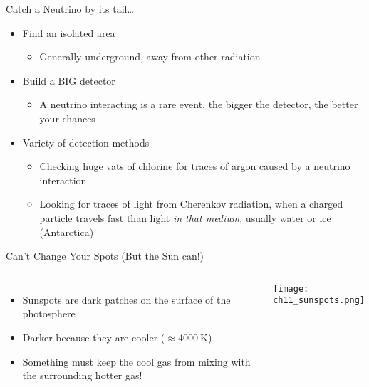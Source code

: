\documentclass[pdf, aspectratio=169]{beamer}
\begin{document}
\begin{frame}{Catch a Neutrino by its tail\ldots}
  \begin{itemize}
	\item Find an isolated area
	  \begin{itemize}
		\item Generally underground, away from other radiation
	  \end{itemize}
	\item Build a BIG detector
	  \begin{itemize}
		\item A neutrino interacting is a rare event, the bigger the detector, the better your chances
	  \end{itemize}
	\item Variety of detection methods
	  \begin{itemize}
		\item Checking huge vats of chlorine for traces of argon caused by a neutrino interaction
		\item Looking for traces of light from Cherenkov radiation, when a charged particle travels fast than light \emph{in that medium}, usually water or ice (Antarctica)
	  \end{itemize}
  \end{itemize}
\end{frame}


\begin{frame}{Can't Change Your Spots \scriptsize(But the Sun can!)}
  \begin{columns}
	\begin{itemize}
	  \item Sunspots are dark patches on the surface of the photosphere
	  \item Darker because they are cooler ($\approx \SI{4000}{\kelvin}$)
	  \item Something must keep the cool gas from mixing with the surrounding hotter gas!
	\end{itemize}
	\begin{center}
	  \texttt{[image: ch11\_sunspots.png]}
	\end{center}
  \end{columns}
\end{frame}

\end{document}
